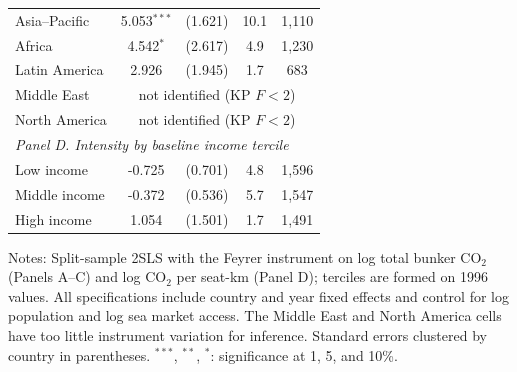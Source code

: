 \documentclass[12pt]{extarticle}
\begin{document}
\begin{table}[H]
{\begin{threeparttable}
\begin{tabular}{lcccc}
  Asia--Pacific & 5.053$^{***}$ & (1.621) & 10.1 & 1,110 \\
  Africa & 4.542$^{*}$ & (2.617) & 4.9 & 1,230 \\
  Latin America & 2.926 & (1.945) & 1.7 & 683 \\
  Middle East & \multicolumn{4}{c}{not identified (KP $F<2$)} \\
  North America & \multicolumn{4}{c}{not identified (KP $F<2$)} \\
\midrule
\multicolumn{5}{l}{\textit{Panel D. Intensity by baseline income tercile}} \\
  Low income & -0.725 & (0.701) & 4.8 & 1,596 \\
  Middle income & -0.372 & (0.536) & 5.7 & 1,547 \\
  High income & 1.054 & (1.501) & 1.7 & 1,491 \\
\bottomrule
\end{tabular}
\begin{tablenotes}[flushleft]
\footnotesize
\item Notes: Split-sample 2SLS with the Feyrer instrument on log total bunker CO$_2$ (Panels A--C) and log CO$_2$ per seat-km (Panel D); terciles are formed on 1996 values. All specifications include country and year fixed effects and control for log population and log sea market access. The Middle East and North America cells have too little instrument variation for inference. Standard errors clustered by country in parentheses. $^{***}$, $^{**}$, $^{*}$: significance at 1, 5, and 10\%.
\end{tablenotes}
\end{threeparttable}}
\end{table}
\end{document}

